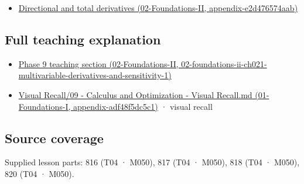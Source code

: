 \begin{itemize}
\tightlist
\item
  \href{../02-Foundations-II/main.pdf\#nameddest=appendix-e2d476574aab}{Directional and total derivatives (02-Foundations-II, appendix-e2d476574aab)}
\end{itemize}

\subsection{Full teaching explanation}\label{appendix-677b59746ae0-full-teaching-explanation}

\begin{itemize}
\tightlist
\item
  \href{../02-Foundations-II/main.pdf\#nameddest=02-foundations-ii-ch021-multivariable-derivatives-and-sensitivity-1}{Phase 9 teaching section (02-Foundations-II, 02-foundations-ii-ch021-multivariable-derivatives-and-sensitivity-1)}
\item
  \href{../01-Foundations-I/main.pdf\#nameddest=appendix-adf48f5dc5c1}{Visual Recall/09 - Calculus and Optimization - Visual Recall.md (01-Foundations-I, appendix-adf48f5dc5c1)} · visual recall
\end{itemize}

\subsection{Source coverage}\label{appendix-677b59746ae0-source-coverage}

Supplied lesson parts: 816 (T04 · M050), 817 (T04 · M050), 818 (T04 · M050), 820 (T04 · M050).
